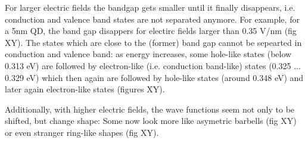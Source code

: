 For larger electric fields the bandgap gets smaller until it finally disappears, i.e. conduction and valence band states are not separated anymore. For example, for a 5nm  QD, the band gap disappers for electirc fields larger than 0.35 V/nm (fig XY). The states which are close to the (former) band gap cannot be sepearted in conduction and valence band: as energy increases, some hole-like states (below 0.313 eV) are followed by electron-like (i.e. conduction band-like) states (0.325 ... 0.329 eV) which then again are followed by hole-like states (around 0.348 eV) and later again electron-like states (figures XY).

Additionally, with higher electric fields, the wave functions seem not only to be shifted, but change shape: Some now look more like asymetric barbells (fig XY) or even stranger ring-like shapes (fig XY).




